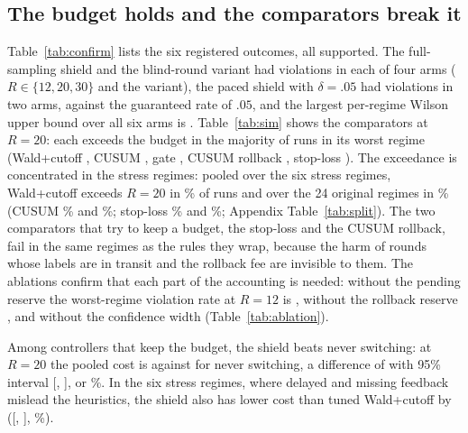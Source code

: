 \documentclass{article}
\theoremstyle{plain}
\theoremstyle{definition}
\begin{document}
\subsection{The budget holds and the comparators break it}
Table~\ref{tab:confirm} lists the six registered outcomes, all supported. The full-sampling shield and the blind-round variant had \COneTotal{} violations in each of four arms ($R\in\{12,20,30\}$ and the variant), the paced shield with $\delta=.05$ had \CTwoTotal{} violations in two arms, against the guaranteed rate of $.05$, and the largest per-regime Wilson upper bound over all six arms is \CTwoMaxHi. Table~\ref{tab:sim} shows the comparators at $R=20$: each exceeds the budget in the majority of runs in its worst regime (Wald+cutoff \WorstWald, CUSUM \WorstCusum, gate \WorstGate, CUSUM rollback \WorstCusumRb, stop-loss \WorstStop). The exceedance is concentrated in the stress regimes: pooled over the six stress regimes, Wald+cutoff exceeds $R=20$ in \StressExceedWald\% of runs and over the 24 original regimes in \OrigExceedWald\% (CUSUM \StressExceedCusum\% and \OrigExceedCusum\%; stop-loss \StressExceedStop\% and \OrigExceedStop\%; Appendix Table~\ref{tab:split}). The two comparators that try to keep a budget, the stop-loss and the CUSUM rollback, fail in the same regimes as the rules they wrap, because the harm of rounds whose labels are in transit and the rollback fee are invisible to them. The ablations confirm that each part of the accounting is needed: without the pending reserve the worst-regime violation rate at $R=12$ is \AblNoPending, without the rollback reserve \AblNoRollback, and without the confidence width \AblNoConf (Table~\ref{tab:ablation}).

Among controllers that keep the budget, the shield beats never switching: at $R=20$ the pooled cost is \JFthreeTwenty{} against \JNever{} for never switching, a difference of \SimVsNeverDelta{} with 95\% interval [\SimVsNeverLo, \SimVsNeverHi], or \SimVsNeverPct\%. In the six stress regimes, where delayed and missing feedback mislead the heuristics, the shield also has lower cost than tuned Wald+cutoff by \StressDelta{} ([\StressLo, \StressHi], \StressPct\%).

\begin{table}[t]
\caption{Real streams, pooled over 14 streams (equal weight), \RealRunsPerArm{} runs per arm and condition. $J$ is mean cost per episode, ``vs never'' the difference in $J$, ``viol.'' the number of runs above the budget: $R=24$ for the comparators, the arm's own $R$ ($24$, $60$ or $110$) for the shield and stop-loss. Source: \texttt{real\_tables.md}.}\label{tab:real}
\centering\scriptsize

\end{table}
\end{document}
